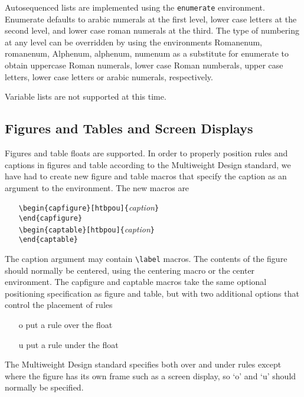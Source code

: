 Autosequenced lists are implemented using the \verb|enumerate|
environment.  Enumerate defaults to arabic numerals at the first
level, lower case letters at the second level, and lower case roman
numerals at the third.  The type of numbering at any level can be
overridden by using the environments Romanenum, romanenum, Alphenum,
alphenum, numenum as a substitute for enumerate to obtain uppercase
Roman numerals, lower case Roman numberals, upper case letters, lower
case letters or arabic numerals, respectively.

Variable lists are not supported at this time.

\subsection{Figures and Tables and Screen Displays}
Figures and table floats are supported.
In order to properly position rules and captions in figures and table
according to the Multiweight Design standard, we have had to create
new figure and table macros that specify the caption as an argument
to the environment.  The new macros are
  \begin{itemize}
    \item[]
          \verb|\begin{capfigure}[htbpou]{|{\it caption}\verb|}|\\
          \verb|\end{capfigure}|\\
          \verb|\begin{captable}[htbpou]{|{\it caption}\verb|}|\\
          \verb|\end{captable}|
  \end{itemize}
The caption argument may contain \verb|\label| macros.
The contents of the figure should normally be centered, using the
centering macro or the center environment.  The capfigure and captable
macros take the same optional positioning specification as figure and
table, but with two additional options that control the placement of rules
  \begin{itemize}
    \item[o] put a rule over the float
    \item[u] put a rule under the float
  \end{itemize}
The Multiweight Design standard specifies both over and under rules
except where the figure has its own frame such as a screen display, so
`o' and `u' should normally be specified.

